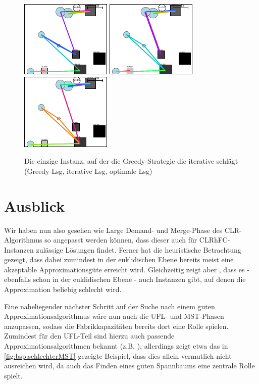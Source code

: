 \documentclass[a4paper,ngerman,11pt,bibtotoc]{scrartcl}
\theoremstyle{definition}
\theoremstyle{plain}
\theoremstyle{remark}
\newcommand{\CLR}{CLR}
\newcommand{\CLRHFC}{CLRhFC}
\newcommand{\MST}{MST}
\newcommand{\UFL}{UFL}
\begin{document}
	\begin{figure}[h]\centering
		\includegraphics[width=.3\textwidth]{bilder/GreedyBesser-Greedy.pdf}
		\includegraphics[width=.3\textwidth]{bilder/GreedyBesser-It.pdf}
		\includegraphics[width=.3\textwidth]{bilder/GreedyBesser-OPT.pdf}
		\caption{Die einzige Instanz, auf der die Greedy-Strategie die iterative schlägt \\ (Greedy-Lsg, iterative Lsg, optimale Lsg)}\label{fig:GreedyBesser}
	\end{figure}

\newpage

\section*{Ausblick}
	
Wir haben nun also gesehen wie Large Demand- und Merge-Phase des \CLR-Algorithmus so angepasst werden können, dass dieser auch für \CLRHFC-Instanzen zulässige Lösungen findet. Ferner hat die heuristische Betrachtung gezeigt, dass dabei zumindest in der euklidischen Ebene bereits meist eine akzeptable Approximationsgüte erreicht wird. Gleichzeitig zeigt aber , dass es - ebenfalls schon in der euklidischen Ebene - auch Instanzen gibt, auf denen die Approximation beliebig schlecht wird.
	
Eine naheliegender nächster Schritt auf der Suche nach einem guten Approximationsalgorithmus wäre nun auch die \UFL- und \MST-Phasen anzupassen, sodass die Fabrikkapazitäten bereits dort eine Rolle spielen. Zumindest für den \UFL-Teil sind hierzu auch passende Approximationsalgorithmen bekannt (z.B. \cite{Pal01facilitylocation}), allerdings zeigt etwa das in \cref{fig:bsp:schlechterMST} gezeigte Beispiel, dass dies allein vermutlich nicht ausreichen wird, da auch das Finden eines guten Spannbaums eine zentrale Rolle spielt.
\end{document}
